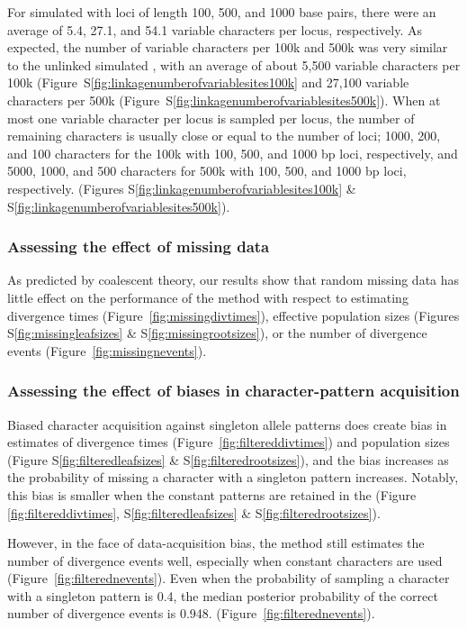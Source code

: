 For simulated \datasets with loci of length 100, 500, and 1000 base pairs, there
were an average of 5.4, 27.1, and 54.1 variable characters per locus,
respectively.
As expected, the number of variable characters per 100k and 500k \dataset
was very similar to the unlinked simulated \datasets, with an average of
about
5,500 variable characters per 100k \dataset
(Figure~S\ref{fig:linkagenumberofvariablesites100k}
and
27,100 variable characters per 500k \dataset
(Figure~S\ref{fig:linkagenumberofvariablesites500k}).
When at most one variable character per locus is sampled per locus, the
number of remaining characters is usually close or equal to the
number of loci;
1000, 200, and 100 characters for the 100k \datasets
with 100, 500, and 1000 bp loci, respectively, and
5000, 1000, and 500 characters for 500k \datasets
with 100, 500, and 1000 bp loci, respectively.
(Figures
S\ref{fig:linkagenumberofvariablesites100k}
\&
S\ref{fig:linkagenumberofvariablesites500k}).


\subsubsection{Assessing the effect of missing data}

As predicted by coalescent theory, our results show that random missing data
has little effect on the performance of the method with respect to estimating
divergence times
(Figure~\ref{fig:missingdivtimes}),
effective population sizes
(Figures
S\ref{fig:missingleafsizes}
\&
S\ref{fig:missingrootsizes}), or the number of divergence events
(Figure~\ref{fig:missingnevents}).


\subsubsection{Assessing the effect of biases in character-pattern acquisition}

Biased character acquisition against singleton allele patterns does create
bias in estimates of divergence times
(Figure~\ref{fig:filtereddivtimes}) and
population sizes
(Figure
S\ref{fig:filteredleafsizes}
\&
S\ref{fig:filteredrootsizes}), and the bias increases as the probability of
missing a character with a singleton pattern increases.
Notably, this bias is smaller when the constant patterns are retained in
the \dataset
(Figure
\ref{fig:filtereddivtimes},
S\ref{fig:filteredleafsizes}
\&
S\ref{fig:filteredrootsizes}).

However, in the face of data-acquisition bias, the method still estimates the
number of divergence events well, especially when constant characters are used
(Figure~\ref{fig:filterednevents}).
Even when the probability of sampling a character with a singleton pattern is
0.4, the median posterior probability of the correct number of divergence
events is 0.948.
(Figure~\ref{fig:filterednevents}).



